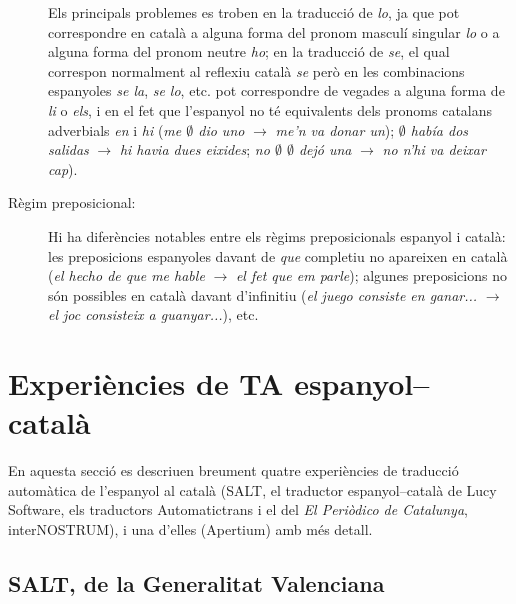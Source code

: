 \begin{description}
Els principals problemes es troben en la traducció de \emph{lo}, ja que
pot correspondre 
en català a alguna forma del pronom masculí singular {\em
  lo} o a alguna forma del
pronom neutre \emph{ho}; en la traducció de 
\emph{se}, el qual correspon normalment al reflexiu 
català \emph{se} però
en les combinacions espanyoles \emph{se la}, \emph{se lo}, etc. pot
correspondre de vegades a alguna forma de \emph{li} o \emph{els}, i en
el fet que l'espanyol no té equivalents dels pronoms catalans
adverbials \emph{en} i \emph{hi}  (\emph{me $\emptyset$ dio uno}
$\rightarrow$
\emph{me'n va donar un}); \emph{$\emptyset$ había dos salidas}
$\rightarrow$ \emph{hi havia dues eixides}; \emph{no $\emptyset$
  $\emptyset$ dejó una} $\rightarrow$ \emph{no n'hi va deixar cap}).
\item[Règim preposicional:] Hi ha diferències notables entre
  els règims preposicionals espanyol i català: les
  preposicions espanyoles davant de \emph{que} completiu no apareixen
  en català (\emph{el hecho de que me hable} $\rightarrow$ \emph{el
    fet que em parle}); algunes preposicions no són possibles en català
  davant d'infinitiu (\emph{el juego consiste en ganar...}
  $\rightarrow$ \emph{el joc consisteix a guanyar...}), etc.
\end{description}

\section{Experiències de TA espanyol--català}
\label{se:ETACC}

En aquesta secció es descriuen breument quatre experiències de
traducció automàtica de l'espanyol al català (SALT, el traductor
espanyol--català de Lucy Software, els traductors Automatictrans i el
del \textit{El Periòdico de Catalunya}, interNOSTRUM), i una d'elles
(Apertium) amb més detall.

\subsection{SALT, de la Generalitat Valenciana}


